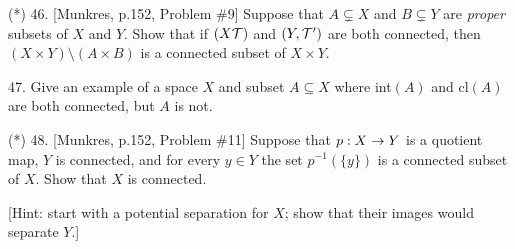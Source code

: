 \documentclass[12]{article}
\begin{document}
\begin{description}
\msk

\item{(*)} 46. [Munkres, p.152, Problem \#9] Suppose that 
$A\subsetneq X$ and $B\subsetneq Y$ are {\it proper} subsets of $X$ and $Y$.
Show that if $(X{\mathcal T})$ and $(Y,{\mathcal T}^\prime)$ are both connected, then 
$(X\times Y)\setminus(A\times B)$ is a connected subset of $X\times Y$.

\msk

\item{47.} Give an example of a space $X$ and subset $A\subseteq X$ where 
int$(A)$ and cl$(A)$ are both connected, but $A$ is not.

\msk

\item{(*)} 48. [Munkres, p.152, Problem \#11]
Suppose that $p:X\rightarrow Y$ is a quotient map, $Y$ is connected, and 
for every $y\in Y$ the set $p^{-1}(\{y\})$ is a connected subset of $X$.
Show that $X$ is connected.

\ssk

\item{\spc} [Hint: start with a potential separation for $X$; show that their
images would separate $Y$.]


\end{description}
\vfill
\end{document}
